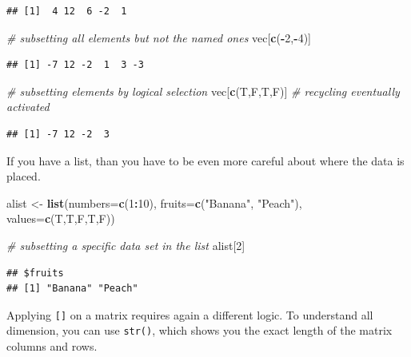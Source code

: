 \documentclass[]{report}
\newenvironment{Shaded}{\begin{snugshade}}{\end{snugshade}}
\newcommand{\KeywordTok}[1]{\textcolor[rgb]{0.13,0.29,0.53}{\textbf{#1}}}
\newcommand{\DataTypeTok}[1]{\textcolor[rgb]{0.13,0.29,0.53}{#1}}
\newcommand{\DecValTok}[1]{\textcolor[rgb]{0.00,0.00,0.81}{#1}}
\newcommand{\StringTok}[1]{\textcolor[rgb]{0.31,0.60,0.02}{#1}}
\newcommand{\CommentTok}[1]{\textcolor[rgb]{0.56,0.35,0.01}{\textit{#1}}}
\newcommand{\OperatorTok}[1]{\textcolor[rgb]{0.81,0.36,0.00}{\textbf{#1}}}
\newcommand{\NormalTok}[1]{#1}
\begin{document}
\begin{verbatim}
## [1]  4 12  6 -2  1
\end{verbatim}

\begin{Shaded}
\begin{Highlighting}[]
\CommentTok{# subsetting all elements but not the named ones}
\NormalTok{vec[}\KeywordTok{c}\NormalTok{(}\OperatorTok{-}\DecValTok{2}\NormalTok{,}\OperatorTok{-}\DecValTok{4}\NormalTok{)]}
\end{Highlighting}
\end{Shaded}

\begin{verbatim}
## [1] -7 12 -2  1  3 -3
\end{verbatim}

\begin{Shaded}
\begin{Highlighting}[]
\CommentTok{# subsetting elements by logical selection}
\NormalTok{vec[}\KeywordTok{c}\NormalTok{(T,F,T,F)] }\CommentTok{# recycling eventually activated}
\end{Highlighting}
\end{Shaded}

\begin{verbatim}
## [1] -7 12 -2  3
\end{verbatim}

If you have a list, than you have to be even more careful about where
the data is placed.

\begin{Shaded}
\begin{Highlighting}[]
\NormalTok{alist <-}\StringTok{ }\KeywordTok{list}\NormalTok{(}\DataTypeTok{numbers=}\KeywordTok{c}\NormalTok{(}\DecValTok{1}\OperatorTok{:}\DecValTok{10}\NormalTok{),}
      \DataTypeTok{fruits=}\KeywordTok{c}\NormalTok{(}\StringTok{"Banana"}\NormalTok{, }\StringTok{"Peach"}\NormalTok{),}
      \DataTypeTok{values=}\KeywordTok{c}\NormalTok{(T,T,F,T,F))}

\CommentTok{# subsetting a specific data set in the list}
\NormalTok{alist[}\DecValTok{2}\NormalTok{]}
\end{Highlighting}
\end{Shaded}

\begin{verbatim}
## $fruits
## [1] "Banana" "Peach"
\end{verbatim}

Applying \texttt{{[}{]}} on a matrix requires again a different logic.
To understand all dimension, you can use \texttt{str()}, which shows you
the exact length of the matrix columns and rows.
\end{document}
